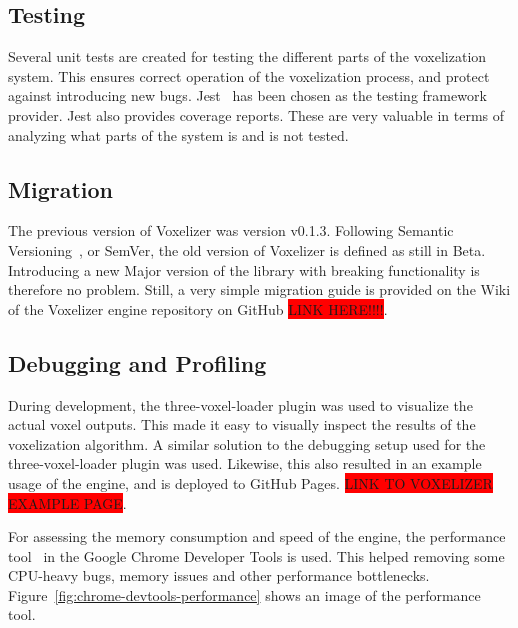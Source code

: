\subsection{Testing}
Several unit tests are created for testing the different parts of the voxelization system. This ensures correct operation of the voxelization process, and protect against introducing new bugs. Jest~\cite{jest} has been chosen as the testing framework provider. Jest also provides coverage reports. These are very valuable in terms of analyzing what parts of the system is and is not tested.

\subsection{Migration}
The previous version of Voxelizer was version v0.1.3. Following Semantic Versioning~\cite{semantic-versioning}, or SemVer, the old version of Voxelizer is defined as still in Beta. Introducing a new Major version of the library with breaking functionality is therefore no problem. Still, a very simple migration guide is provided on the Wiki of the Voxelizer engine repository on GitHub \colorbox{red}{LINK HERE!!!!}.

\subsection{Debugging and Profiling}
During development, the three-voxel-loader plugin was used to visualize the actual voxel outputs. This made it easy to visually inspect the results of the voxelization algorithm. A similar solution to the debugging setup used for the three-voxel-loader plugin was used. Likewise, this also resulted in an example usage of the engine, and is deployed to GitHub Pages. \colorbox{red}{LINK TO VOXELIZER EXAMPLE PAGE}.

For assessing the memory consumption and speed of the engine, the performance tool~\cite{chrome-dev-tools-profiler} in the Google Chrome Developer Tools is used. This helped removing some CPU-heavy bugs, memory issues and other performance bottlenecks. Figure~\ref{fig:chrome-devtools-performance} shows an image of the performance tool.

